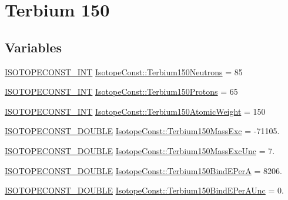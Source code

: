 \hypertarget{group___isotope_const-_terbium-_tb150}{}\section{Terbium 150}
\label{group___isotope_const-_terbium-_tb150}
\subsection*{Variables}
\begin{DoxyCompactItemize}
\item 
\mbox{\hyperlink{group___isotope_const-_macros_ga5f18360b3e99483a35c32d789e62621c}{I\+S\+O\+T\+O\+P\+E\+C\+O\+N\+S\+T\+\_\+\+I\+NT}} \mbox{\hyperlink{group___isotope_const-_terbium-_tb150_gad0cc22186aa04a549c18ca7c902905bb}{Isotope\+Const\+::\+Terbium150\+Neutrons}} = 85
\item 
\mbox{\hyperlink{group___isotope_const-_macros_ga5f18360b3e99483a35c32d789e62621c}{I\+S\+O\+T\+O\+P\+E\+C\+O\+N\+S\+T\+\_\+\+I\+NT}} \mbox{\hyperlink{group___isotope_const-_terbium-_tb150_ga4f5814b2ae0ff038e03d1c28c07cb9aa}{Isotope\+Const\+::\+Terbium150\+Protons}} = 65
\item 
\mbox{\hyperlink{group___isotope_const-_macros_ga5f18360b3e99483a35c32d789e62621c}{I\+S\+O\+T\+O\+P\+E\+C\+O\+N\+S\+T\+\_\+\+I\+NT}} \mbox{\hyperlink{group___isotope_const-_terbium-_tb150_gaa0c2493139cb90bc8123aecf267ed739}{Isotope\+Const\+::\+Terbium150\+Atomic\+Weight}} = 150
\item 
\mbox{\hyperlink{group___isotope_const-_macros_ga8f45a7272ce02c0b4c65c44636ed719a}{I\+S\+O\+T\+O\+P\+E\+C\+O\+N\+S\+T\+\_\+\+D\+O\+U\+B\+LE}} \mbox{\hyperlink{group___isotope_const-_terbium-_tb150_ga22f883adcaed5b7dceaab6eadb18da9e}{Isotope\+Const\+::\+Terbium150\+Mass\+Exc}} = -\/71105.
\item 
\mbox{\hyperlink{group___isotope_const-_macros_ga8f45a7272ce02c0b4c65c44636ed719a}{I\+S\+O\+T\+O\+P\+E\+C\+O\+N\+S\+T\+\_\+\+D\+O\+U\+B\+LE}} \mbox{\hyperlink{group___isotope_const-_terbium-_tb150_ga4a984e4dda5d6c981d1dc28a24ee0cab}{Isotope\+Const\+::\+Terbium150\+Mass\+Exc\+Unc}} = 7.
\item 
\mbox{\hyperlink{group___isotope_const-_macros_ga8f45a7272ce02c0b4c65c44636ed719a}{I\+S\+O\+T\+O\+P\+E\+C\+O\+N\+S\+T\+\_\+\+D\+O\+U\+B\+LE}} \mbox{\hyperlink{group___isotope_const-_terbium-_tb150_gae32ade9089f8ba1e8957aecbdb503963}{Isotope\+Const\+::\+Terbium150\+Bind\+E\+PerA}} = 8206.
\item 
\mbox{\hyperlink{group___isotope_const-_macros_ga8f45a7272ce02c0b4c65c44636ed719a}{I\+S\+O\+T\+O\+P\+E\+C\+O\+N\+S\+T\+\_\+\+D\+O\+U\+B\+LE}} \mbox{\hyperlink{group___isotope_const-_terbium-_tb150_ga622924ea898ffde5f0eabc18418411b0}{Isotope\+Const\+::\+Terbium150\+Bind\+E\+Per\+A\+Unc}} = 0.

\end{DoxyCompactItemize}
